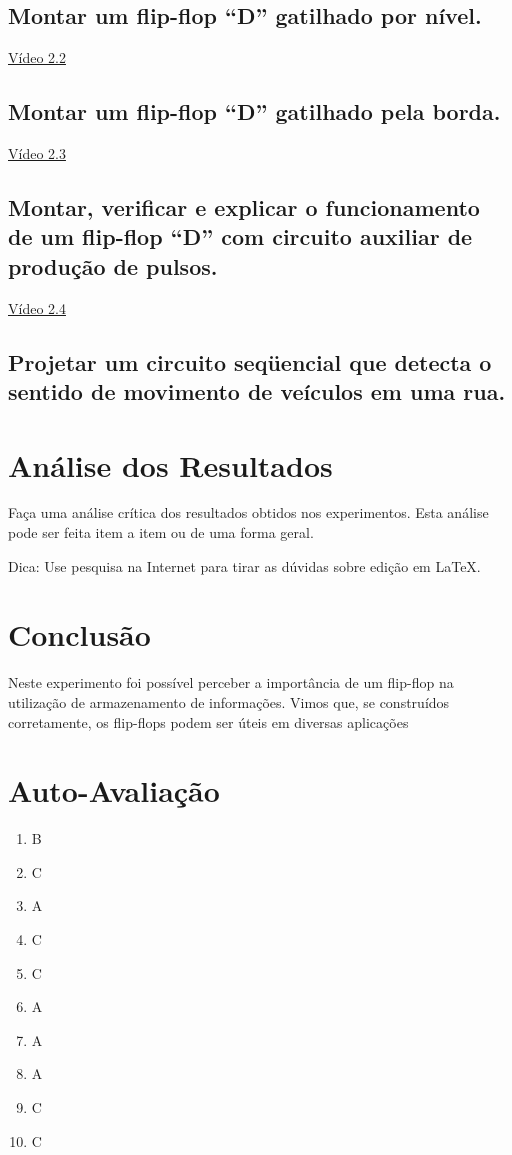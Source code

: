 \documentclass[12pt]{article}
\begin{document}
\subsection{Montar um flip-flop “D” gatilhado por nível.}
\label{2.2}

\href{https://youtu.be/azJt3y337BE}{Vídeo 2.2}

\subsection{Montar um flip-flop “D” gatilhado pela borda.}
\label{2.3}

\href{https://youtu.be/1GDHpbQ8CnU}{Vídeo 2.3}

\subsection{Montar, verificar e explicar o funcionamento de um flip-flop “D” com circuito auxiliar de produção de pulsos.}
\label{2.4}

\href{https://youtu.be/c2MW7RQl_7s}{Vídeo 2.4}

\subsection{Projetar um circuito seqüencial que detecta o sentido de movimento de veículos em uma rua. }
\label{2.5}



\section{Análise dos Resultados}
\label{sec:Resultados}

Faça uma análise crítica dos resultados obtidos nos experimentos. Esta análise pode ser feita item a item ou de uma forma geral.

Dica: Use pesquisa na Internet para tirar as dúvidas sobre edição em \LaTeX .

\section{Conclusão}
\label{sec:Conclusao}

Neste experimento foi possível perceber a importância de um flip-flop na utilização de armazenamento de informações. Vimos que, se construídos corretamente, os flip-flops podem ser úteis em diversas aplicações

\newpage 
\section*{Auto-Avaliação}

\begin{enumerate}
    \item B
    \item C
    \item A
    \item C
    \item C
    \item A
    \item A
    \item A
    \item C
    \item C
\end{enumerate}
\end{document}
